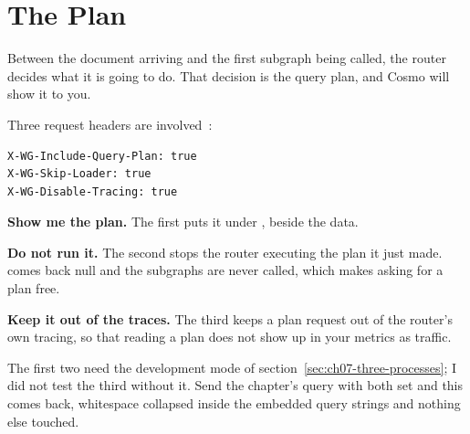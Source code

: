 \section{The Plan}
\label{sec:ch07-the-plan}
%

Between the document arriving and the first subgraph being called, the router
decides what it is going to do. That decision is the query plan, and Cosmo will
show it to you.

%
Three request headers are involved~\autocite{cosmo2026queryplan}:

\begin{verbatim}
X-WG-Include-Query-Plan: true
X-WG-Skip-Loader: true
X-WG-Disable-Tracing: true
\end{verbatim}

\medskip\noindent\textbf{Show me the plan.} The first puts it under
, beside the data.

\medskip\noindent\textbf{Do not run it.} The second stops the router executing
the plan it just made.  comes back null and the subgraphs are never
called, which makes asking for a plan free.

\medskip\noindent\textbf{Keep it out of the traces.} The third keeps a plan
request out of the router's own tracing, so that reading a plan does not show up
in your metrics as traffic.

\medskip
The first two need the development mode of
section~\ref{sec:ch07-three-processes}; I did not test the third without it.
Send the chapter's query with both set and this comes back, whitespace collapsed
inside the embedded query strings and nothing else touched.

